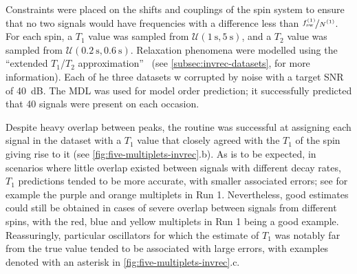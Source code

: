 Constraints were placed on the shifts and
couplings of the spin system to ensure that no two signals would have
frequencies with a difference less than $\nicefrac{\fswone}{\None}$.
For each spin, a $T_1$ value was sampled from $\mathcal{U}(\qty{1}{\second},
\qty{5}{\second})$, and a $T_2$ value was sampled from
$\mathcal{U}(\qty{0.2}{\second}, \qty{0.6}{\second})$.
Relaxation phenomena were modelled using the ``extended $T_1$/$T_2$
approximation''~\cite{SpinachRelax} (see \cref{subsec:invrec-datasets},
 for more
information).
Each of he three datasets w corrupted by noise with a target
\ac{SNR} of \qty{40}{\deci\bel}. The \ac{MDL} was used for model order
prediction; it successfully predicted that 40 signals were present on each
occasion.

Despite heavy overlap between peaks, the routine was successful at
assigning each signal in the dataset with a $T_1$ value that closely agreed
with the $T_1$ of the spin giving rise to it (see
\cref{fig:five-multiplets-invrec}.b). As is to be
expected, in scenarios where little overlap existed between signals with
different decay rates, $T_1$ predictions tended to be more accurate, with
smaller associated errors; see for example the purple and orange multiplets in Run 1.
Nevertheless, good estimates could still be obtained in cases of severe
overlap between signals from different spins, with the red, blue and yellow
multiplets in Run 1 being a good example. Reassuringly, particular oscillators
for which the estimate of $T_1$ was notably far from the true value tended to
be associated with large errors, with examples denoted with an asterisk in
\cref{fig:five-multiplets-invrec}.c.


